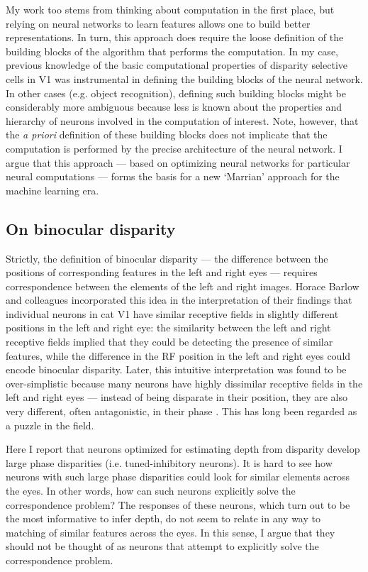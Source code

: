 My work too stems from thinking about computation in the first place, but relying on neural networks to learn features allows one to build better representations. In turn, this approach does require the loose definition of the building blocks of the algorithm that performs the computation. In my case, previous knowledge of the basic computational properties of disparity selective cells in V1 was instrumental in defining the building blocks of the neural network. In other cases (e.g. object recognition), defining such building blocks might be considerably more ambiguous because less is known about the properties and hierarchy of neurons involved in the computation of interest. Note, however, that the \textit{a priori} definition of these building blocks does not implicate that the computation is performed by the precise architecture of the neural network. I argue that this approach --- based on optimizing neural networks for particular neural computations --- forms the basis for a new `Marrian' approach for the machine learning era.

\subsection*{On binocular disparity}

Strictly, the definition of binocular disparity --- the difference between the positions of corresponding features in the left and right eyes --- requires correspondence between the elements of the left and right images. Horace Barlow and colleagues \cite{Barlow:1967bs} incorporated this idea in the interpretation of their findings that individual neurons in cat V1 have similar receptive fields in slightly different positions in the left and right eye: the similarity between the left and right receptive fields implied that they could be detecting the presence of similar features, while the difference in the RF position in the left and right eyes could encode binocular disparity. Later, this intuitive interpretation was found to be over-simplistic because many neurons have highly dissimilar receptive fields in the left and right eyes --- instead of being disparate in their position, they are also very different, often antagonistic, in their phase \cite{DeAngelis:1991mb}. This has long been regarded as a puzzle in the field.

Here I report that neurons optimized for estimating depth from disparity develop large phase disparities (i.e. tuned-inhibitory neurons). It is hard to see how neurons with such large phase disparities could look for similar elements across the eyes. In other words, how can such neurons explicitly solve the correspondence problem? The responses of these neurons, which turn out to be the most informative to infer depth, do not seem to relate in any way to matching of similar features across the eyes. In this sense, I argue that they should not be thought of as neurons that attempt to explicitly solve the correspondence problem.

